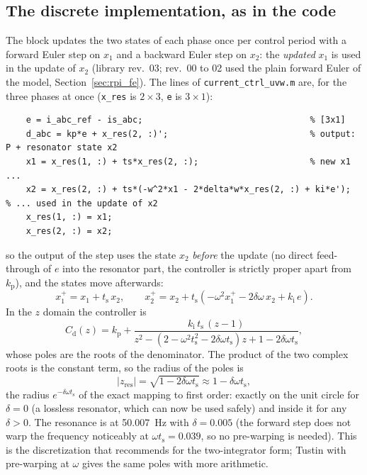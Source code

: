 \documentclass[11pt,a4paper]{scrartcl}
\newcommand{\ped}[1]{_{\mathrm{#1}}}
\newcommand{\code}[1]{\texttt{#1}}
\begin{document}
\begin{onehalfspace}
\subsection{The discrete implementation, as in the code}
\label{sec:rpi_disc}

The block updates the two states of each phase once per control period with a forward Euler step on $x_1$ and a backward Euler step on $x_2$: the \emph{updated} $x_1$ is used in the update of $x_2$ (library rev.~03; rev.~00 to 02 used the plain forward Euler of the model, Section~\ref{sec:rpi_fe}). The lines of \code{current\_ctrl\_uvw.m} are, for the three phases at once (\code{x\_res} is $2 \times 3$, \code{e} is $3 \times 1$):
{\scriptsize
\begin{verbatim}
    e = i_abc_ref - is_abc;                                 % [3x1]
    d_abc = kp*e + x_res(2, :)';                            % output: P + resonator state x2
    x1 = x_res(1, :) + ts*x_res(2, :);                      % new x1 ...
    x2 = x_res(2, :) + ts*(-w^2*x1 - 2*delta*w*x_res(2, :) + ki*e');   % ... used in the update of x2
    x_res(1, :) = x1;
    x_res(2, :) = x2;
\end{verbatim}
}
\noindent so the output of the step uses the state $x_2$ \emph{before} the update (no direct feed-through of $e$ into the resonator part, the controller is strictly proper apart from $k\ped{p}$), and the states move afterwards:
\begin{equation}
	x_1^{+} = x_1 + t\ped{s}\, x_2, \qquad x_2^{+} = x_2 + t\ped{s}\left(-\omega^2 x_1^{+} - 2\delta\omega\, x_2 + k\ped{i}\, e\right).
	\label{eq:fb}
\end{equation}
In the $z$ domain the controller is
\begin{equation}
	C\ped{d}(z) = k\ped{p} + \frac{k\ped{i}\, t\ped{s}\, (z - 1)}{z^2 - \left(2 - \omega^2 t\ped{s}^2 - 2\delta\omega t\ped{s}\right) z + 1 - 2\delta\omega t\ped{s}},
	\label{eq:cd}
\end{equation}
whose poles are the roots of the denominator. The product of the two complex roots is the constant term, so the radius of the poles is
\begin{equation}
	|z\ped{res}| = \sqrt{1 - 2\delta\omega t\ped{s}} \approx 1 - \delta\omega t\ped{s},
	\label{eq:radius}
\end{equation}
the radius $e^{-\delta\omega t\ped{s}}$ of the exact mapping to first order: exactly on the unit circle for $\delta = 0$ (a lossless resonator, which can now be used safely) and inside it for any $\delta > 0$. The resonance is at \SI{50.007}{\hertz} with $\delta = 0.005$ (the forward step does not warp the frequency noticeably at $\omega t\ped{s} = 0.039$, so no pre-warping is needed). This is the discretization that \cite{yepes2010} recommends for the two-integrator form; Tustin with pre-warping at $\omega$ gives the same poles with more arithmetic.


\end{onehalfspace}
\end{document}
